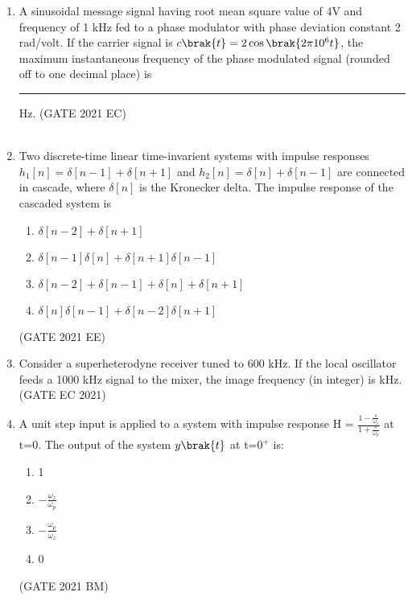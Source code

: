 \begin{enumerate}[label=\thechapter.\arabic*,ref=\thechapter.\theenumi]
\item A sinusoidal message signal having root mean square value of 4V and frequency of 1 kHz fed to a phase modulator with phase deviation constant 2 rad/volt. If the carrier signal is $c\brak{t} = 2\cos \brak{2\pi 10^6 t}$, the maximum instantaneous frequency of the phase modulated signal (rounded off to one decimal place) is \rule{1cm}{0.05mm} Hz. \hfill(GATE 2021 EC)\\
\solution\\

\pagebreak
\item Two discrete-time linear time-invarient systems with impulse responses $h_1[n]=\delta[n-1]+\delta[n+1]$ and $h_2[n]=\delta[n]+\delta[n-1]$ are connected in cascade, where $\delta[n]$ is the Kronecker delta. The impulse response of the cascaded system is   \\
\begin{enumerate}[label=(\alph*)]
    \item $\delta[n-2]+\delta[n+1]$
    \item $\delta[n-1]\delta[n]+\delta[n+1]\delta[n-1]$
    \item $\delta[n-2]+\delta[n-1]+\delta[n]+\delta[n+1]$
    \item $\delta[n]\delta[n-1]+\delta[n-2]\delta[n+1]$
\end{enumerate} \hfill(GATE 2021 EE)\\
\solution

\pagebreak
\item Consider a superheterodyne receiver tuned to 600 kHz. If the local oscillator feeds a 1000 kHz signal to the mixer, the image frequency (in integer) is \underline{\hspace{1cm}} kHz.
\hfill(GATE EC 2021)\\
\solution

\pagebreak
\item A unit step input is applied to a system with impulse response H = $\frac{1- \frac{s}{\omega{_z}}}{1+\frac{s}{\omega{_p}}}$ at t=0. The output of the system $y\brak{t}$ at t=$0^+$ is:
\begin{enumerate}[label=\alph*)]
 \item 1
 \item $-\frac{\omega{_z}}{\omega{_p}}$
 \item $-\frac{\omega{_p}}{\omega{_z}}$
 \item 0
\end{enumerate} \hfill(GATE 2021 BM)\\
\solution



\end{enumerate}
